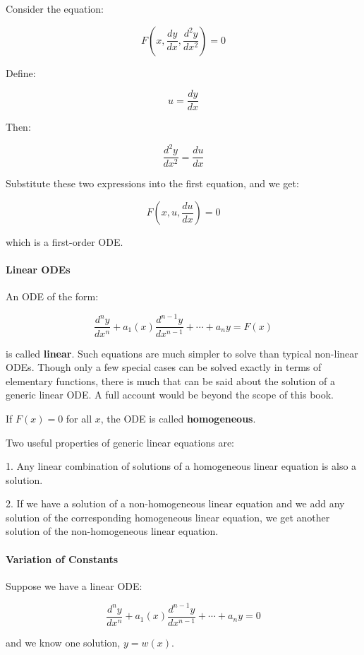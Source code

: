 Consider the equation:

$$F\left(x,\frac{dy}{dx},\frac{d^2y}{dx^2}\right) = 0$$

Define:

$$u = \frac{dy}{dx}$$

Then:

$$\frac{d^2y}{dx^2} = \frac{du}{dx}$$

Substitute these two expressions into the first equation, and we get:

$$F\left(x,u,\frac{du}{dx}\right) = 0$$

which is a first-order ODE.



\paragraph{Linear ODEs}

An ODE of the form:

$$\frac{d^n y}{dx^n} + a_1(x)\frac{d^{n-1}y}{dx^{n-1}} + \cdots + a_n y = F(x)$$

is called \textbf{linear}. Such equations are much simpler to solve than typical non-linear ODEs. Though only a few special cases can be solved exactly in terms of elementary functions, there is much that can be said about the solution of a generic linear ODE. A full account would be beyond the scope of this book.



If $F(x) = 0$ for all $x$, the ODE is called \textbf{homogeneous}.



Two useful properties of generic linear equations are:

1. Any linear combination of solutions of a homogeneous linear equation is also a solution.

2. If we have a solution of a non-homogeneous linear equation and we add any solution of the corresponding homogeneous linear equation, we get another solution of the non-homogeneous linear equation.



\paragraph{Variation of Constants}

Suppose we have a linear ODE:

$$\frac{d^n y}{dx^n} + a_1(x)\frac{d^{n-1}y}{dx^{n-1}} + \cdots + a_n y = 0$$

and we know one solution, $y = w(x)$.




